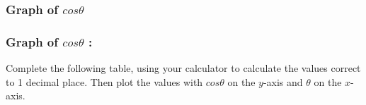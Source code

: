           
        
      
      \label{m39414*uid49}
            \subsubsection{ Graph of $cos\theta $}
            \nopagebreak
            
        
\label{m39414*secfhsst!!!underscore!!!id2385}
            \subsubsection{  Graph of $cos\theta $ :}
            \nopagebreak
            
\label{m39414*uid8032} Complete the following table, using your calculator to calculate the values correct to 1 decimal place. Then plot the values with \begin{math}cos\theta \end{math} on the \begin{math}y\end{math}-axis and \begin{math}\theta \end{math} on the \begin{math}x\end{math}-axis.\par 
        
    
